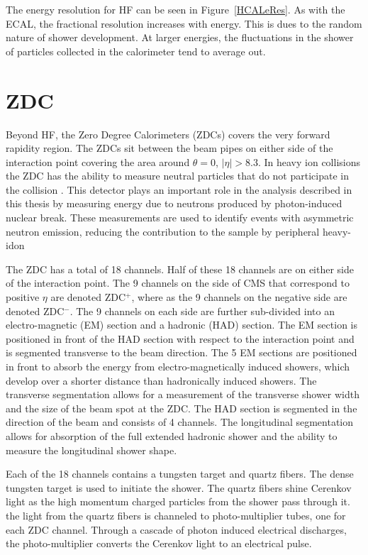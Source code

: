     The energy resolution for HF can be seen in Figure~\ref{HCALeRes}.  
    As with the ECAL, the fractional resolution increases with energy. 
    This is dues to the random nature of shower development. 
    At larger energies, the fluctuations in the shower of particles collected 
      in the calorimeter tend to average out.
    
  \section{ZDC \label{sec:zdcDet}} 
    Beyond HF, the Zero Degree Calorimeters (ZDCs) covers the very forward 
      rapidity region.
    The ZDCs sit between the beam pipes on either side of the interaction point 
      covering the area around $\theta = 0$, $|\eta| > 8.3$.
    In heavy ion collisions the ZDC has the ability to measure neutral particles 
    	that do not participate in the collision \cite{tCmsE}.
    This detector plays an important role in the analysis described in this
      thesis by measuring energy due to neutrons produced by photon-induced 
      nuclear break.
    These measurements are used to identify events with asymmetric neutron 
      emission, reducing the contribution to the sample by peripheral heavy-idon

    The ZDC has a total of 18 channels.
        Half of these 18 channels are on either side of the interaction point.
    The 9 channels on the side of CMS that correspond to positive $\eta$
      are denoted ZDC$^{+}$, where as the 9 channels on the negative side are
      denoted ZDC$^{-}$.
    The 9 channels on each side are further sub-divided into an electro-magnetic  
      (EM) section and a hadronic (HAD) section.
    The EM section is positioned in front of the HAD section with respect to the 
      interaction point and is segmented transverse to the beam direction.
    The 5 EM sections are positioned in front to absorb the energy from 
      electro-magnetically induced showers, which develop over a shorter distance 
      than hadronically induced showers.
    The transverse segmentation allows for a measurement of the transverse shower
      width and the size of the beam spot at the ZDC.
    The HAD section is segmented in the direction of the beam and consists of 4
      channels.
    The longitudinal segmentation allows for absorption of the full extended 
      hadronic shower and the ability to measure the longitudinal shower shape.
    
    Each of the 18 channels contains a tungsten target and quartz fibers.
    The dense tungsten target is used to initiate the shower.
    The quartz fibers shine Cerenkov light as the high momentum charged particles
      from the shower pass through it. 
    the light from the quartz fibers is channeled to photo-multiplier tubes, one 
      for each ZDC channel. 
    Through a cascade of photon induced electrical discharges, the photo-multiplier
      converts the Cerenkov light to an electrical pulse. 
    
